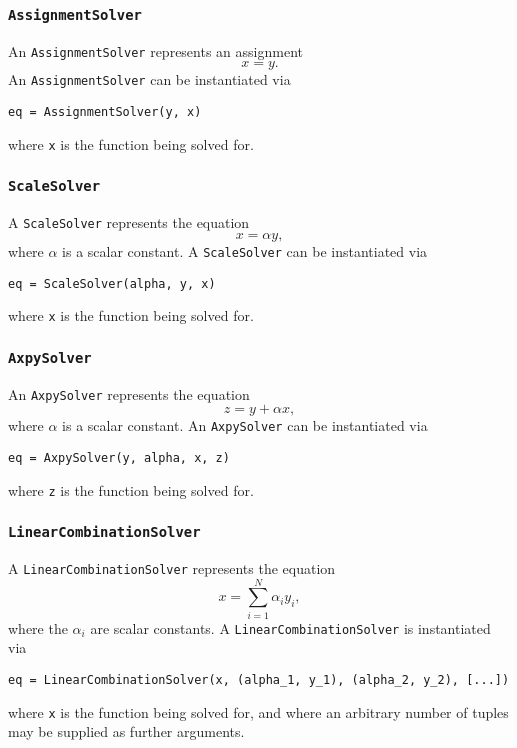 \documentclass[11pt]{article}
\begin{document}
\subsubsection{\texttt{AssignmentSolver}}

An \texttt{AssignmentSolver} represents an assignment
\begin{equation*}
  x = y.
\end{equation*}
An \texttt{AssignmentSolver} can be instantiated via
\begin{lstlisting}
eq = AssignmentSolver(y, x)
\end{lstlisting}
where \texttt{x} is the function being solved for.

\subsubsection{\texttt{ScaleSolver}}

A \texttt{ScaleSolver} represents the equation
\begin{equation*}
  x = \alpha y,
\end{equation*}
where $\alpha$ is a scalar constant. A \texttt{ScaleSolver} can be instantiated
via
\begin{lstlisting}
eq = ScaleSolver(alpha, y, x)
\end{lstlisting}
where \texttt{x} is the function being solved for.

\subsubsection{\texttt{AxpySolver}}

An \texttt{AxpySolver} represents the equation
\begin{equation*}
  z = y + \alpha x,
\end{equation*}
where $\alpha$ is a scalar constant. An \texttt{AxpySolver} can be instantiated
via
\begin{lstlisting}
eq = AxpySolver(y, alpha, x, z)
\end{lstlisting}
where \texttt{z} is the function being solved for.

\subsubsection{\texttt{LinearCombinationSolver}}

A \texttt{LinearCombinationSolver} represents the equation
\begin{equation*}
  x = \sum_{i = 1}^N \alpha_i y_i,
\end{equation*}
where the $\alpha_i$ are scalar constants. A \texttt{LinearCombinationSolver}
is instantiated via
\begin{lstlisting}
eq = LinearCombinationSolver(x, (alpha_1, y_1), (alpha_2, y_2), [...])
\end{lstlisting}
where \texttt{x} is the function being solved for, and where an arbitrary
number of tuples may be supplied as further arguments.
\end{document}
